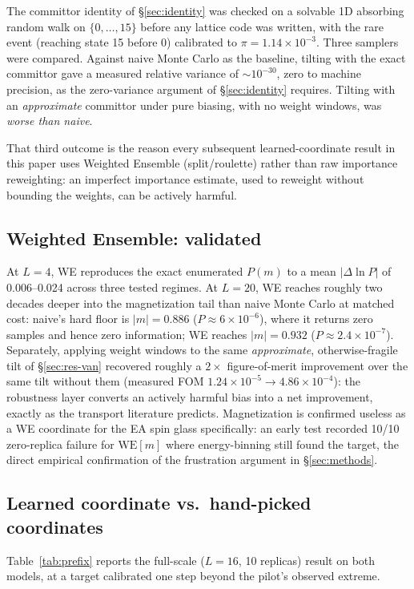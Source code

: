 \documentclass[a4paper,fleqn]{cas-sc}
\let\Oldsubsection\subsection
\renewcommand{\subsection}{\FloatBarrier\Oldsubsection}
\begin{document}
The committor identity of \S\ref{sec:identity} was checked on a solvable 1D absorbing
random walk on $\{0,\dots,15\}$ before any lattice code was written, with the rare event
(reaching state 15 before 0) calibrated to $\pi=1.14\times10^{-3}$. Three samplers were
compared. Against naive Monte Carlo as the baseline, tilting with the exact committor gave
a measured relative variance of ${\sim}10^{-30}$, zero to machine precision, as the
zero-variance argument of \S\ref{sec:identity} requires. Tilting with an
\emph{approximate} committor under pure biasing, with no weight windows, was
\emph{worse than naive}.

That third outcome is the reason every subsequent learned-coordinate result in this paper
uses Weighted Ensemble (split/roulette) rather than raw importance reweighting: an
imperfect importance estimate, used to reweight without bounding the weights, can be
actively harmful.

\subsection{Weighted Ensemble: validated}\label{sec:res-we}
At $L=4$, WE reproduces the exact enumerated $P(m)$ to a mean $|\Delta\ln P|$ of
0.006--0.024 across three tested regimes. At $L=20$, WE reaches roughly two decades deeper
into the magnetization tail than naive Monte Carlo at matched cost: naive's hard floor is
$|m|=0.886$ ($P\approx6\times10^{-6}$), where it returns zero samples and hence zero
information; WE reaches $|m|=0.932$ ($P\approx2.4\times10^{-7}$). Separately, applying
weight windows to the same \emph{approximate}, otherwise-fragile tilt of
\S\ref{sec:res-van} recovered roughly a $2\times$ figure-of-merit improvement
over the same tilt without them (measured FOM $1.24\times10^{-5}\to4.86\times10^{-4}$):
the robustness layer converts an actively harmful bias into a net improvement, exactly as
the transport literature predicts. Magnetization is confirmed useless as a WE coordinate
for the EA spin glass specifically: an early test recorded 10/10 zero-replica failure for
$\mathrm{WE}[m]$ where energy-binning still found the target, the direct empirical
confirmation of the frustration argument in \S\ref{sec:methods}.

\subsection{Learned coordinate vs.\ hand-picked coordinates}\label{sec:res-learned}
Table~\ref{tab:prefix} reports the full-scale ($L=16$, 10 replicas) result on both models,
at a target calibrated one step beyond the pilot's observed extreme.
\end{document}
